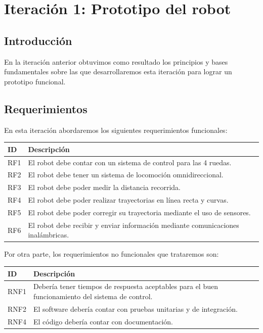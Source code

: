 \newpage
\section{Iteración 1: Prototipo del robot}

\subsection{Introducción}
En la iteración anterior obtuvimos como resultado los principios y bases fundamentales sobre las que desarrollaremos esta iteración para lograr un prototipo funcional.

\subsection{Requerimientos}
En esta iteración abordaremos los siguientes requerimientos funcionales:

\begin{center}
\begin{tabular}{
    | >{\centering\arraybackslash}m{1cm}
    | >{\centering\arraybackslash}m{13cm} |
}
\hline \rowcolor{test_header_color}
    ID & Descripción \\
\hline
    RF1 & El robot debe contar con un sistema de control para las 4 ruedas. \\ 
\hline
    RF2 & El robot debe tener un sistema de locomoción omnidireccional. \\ 
\hline
    RF3 & El robot debe poder medir la distancia recorrida. \\ 
\hline
    RF4 & El robot debe poder realizar trayectorias en línea recta y curvas. \\ 
\hline
    RF5 & El robot debe poder corregir su trayectoria mediante el uso de sensores. \\  
\hline
    RF6 & El robot debe recibir y enviar información mediante comunicaciones inalámbricas. \\ 
\hline
\end{tabular}
\end{center}

Por otra parte, los requerimientos no funcionales que trataremos son:

\begin{center}
\begin{tabular}{
    | >{\centering\arraybackslash}m{1cm}
    | >{\centering\arraybackslash}m{13cm} |
}
\hline \rowcolor{test_header_color}
    ID & Descripción \\
\hline
    RNF1 & Debería tener tiempos de respuesta aceptables para el buen funcionamiento del sistema de control. \\
\hline
    RNF2 & El software debería contar con pruebas unitarias y de integración. \\
\hline
    RNF4 & El código debería contar con documentación.\\
\hline
\end{tabular}
\end{center}

